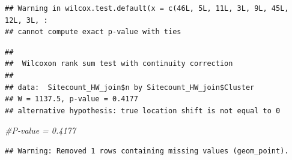 \documentclass[12pt,]{article}
\newenvironment{Shaded}{\begin{snugshade}}{\end{snugshade}}
\newcommand{\KeywordTok}[1]{\textcolor[rgb]{0.13,0.29,0.53}{\textbf{#1}}}
\newcommand{\DataTypeTok}[1]{\textcolor[rgb]{0.13,0.29,0.53}{#1}}
\newcommand{\DecValTok}[1]{\textcolor[rgb]{0.00,0.00,0.81}{#1}}
\newcommand{\StringTok}[1]{\textcolor[rgb]{0.31,0.60,0.02}{#1}}
\newcommand{\CommentTok}[1]{\textcolor[rgb]{0.56,0.35,0.01}{\textit{#1}}}
\newcommand{\OperatorTok}[1]{\textcolor[rgb]{0.81,0.36,0.00}{\textbf{#1}}}
\newcommand{\NormalTok}[1]{#1}
\begin{document}
\begin{Shaded}
\end{Shaded}

\begin{verbatim}
## Warning in wilcox.test.default(x = c(46L, 5L, 11L, 3L, 9L, 45L, 12L, 3L, :
## cannot compute exact p-value with ties
\end{verbatim}

\begin{verbatim}
## 
##  Wilcoxon rank sum test with continuity correction
## 
## data:  Sitecount_HW_join$n by Sitecount_HW_join$Cluster
## W = 1137.5, p-value = 0.4177
## alternative hypothesis: true location shift is not equal to 0
\end{verbatim}

\begin{Shaded}
\begin{Highlighting}[]
\CommentTok{#P-value = 0.4177}
\end{Highlighting}
\end{Shaded}

\begin{verbatim}
## Warning: Removed 1 rows containing missing values (geom_point).
\end{verbatim}
\end{document}
